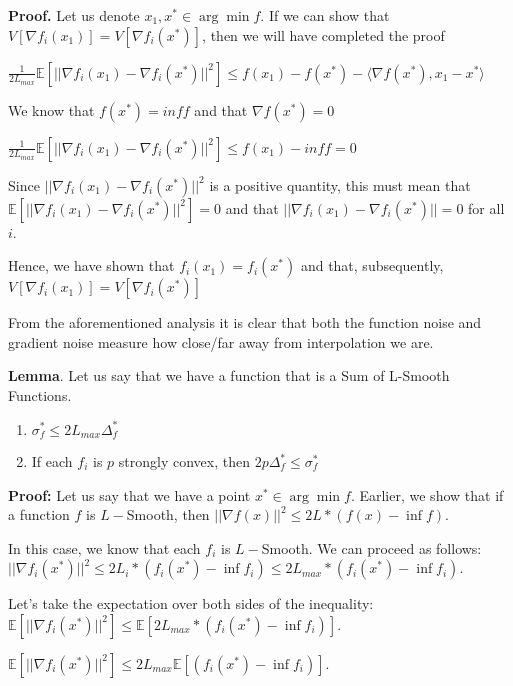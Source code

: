 \noindent \textbf{Proof.} Let us denote $x_1, x^* \in \arg \min f$. If we can show that $V[\nabla f_i(x_1)] = V[\nabla f_i(x^*)]$, then we will have completed the proof 

$\frac{1}{2L_{max}} \mathbb{E}[||\nabla f_i(x_1) - \nabla f_i(x^*)||^2] \leq f(x_1) - f(x^*) - \langle \nabla f(x^*), x_1 - x^* \rangle$

We know that $f(x^*) = inf f$ and that $\nabla f(x^*) = 0$ \newline 

$\frac{1}{2L_{max}} \mathbb{E}[||\nabla f_i(x_1) - \nabla f_i(x^*)||^2] \leq f(x_1) - inf f = 0$

Since $||\nabla f_i(x_1) - \nabla f_i(x^*)||^2$ is a positive quantity, this must mean that $\mathbb{E}[||\nabla f_i(x_1) - \nabla f_i(x^*)||^2] = 0$ and that $||\nabla f_i(x_1) - \nabla f_i(x^*)|| = 0$ for all $i$. 

Hence, we have shown that $f_i(x_1) = f_i(x^*)$ and that, subsequently, $V[\nabla f_i(x_1)] = V[\nabla f_i(x^*)]$

\noindent From the aforementioned analysis it is clear that both the function noise and gradient noise measure how close/far away from interpolation we are. 

\noindent \textbf{Lemma}. Let us say that we have a function that is a Sum of L-Smooth Functions. 

\begin{enumerate}
    \item $\sigma_f^* \leq 2L_{max} \Delta^*_f$
    \item If each $f_i$ is $p$ strongly convex, then $2p\Delta^*_f \leq \sigma_f^*$
\end{enumerate}

\noindent \textbf{Proof:} Let us say that we have a point $x^* \in \arg \min f$. Earlier, we show that if a function $f$ is $L-$Smooth, then $||\nabla f(x)||^2 \leq 2L * (f(x) - \inf f)$. 

In this case, we know that each $f_i$ is $L-$Smooth. We can proceed as follows: \newline 
$||\nabla f_i(x^*)||^2 \leq 2L_i * (f_i(x^*) - \inf f_i) \leq 2L_{max} *  (f_i(x^*) - \inf f_i)$. 

Let's take the expectation over both sides of the inequality: \newline 
$\mathbb{E}[||\nabla f_i(x^*)||^2] \leq \mathbb{E}[2L_{max} * (f_i(x^*) - \inf f_i)]$. \newline  

$\mathbb{E}[||\nabla f_i(x^*)||^2] \leq 2L_{max}  \mathbb{E}[(f_i(x^*) - \inf f_i)]$. 

